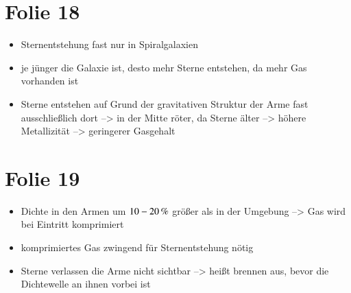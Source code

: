 \section{Folie 18}

\begin{itemize}
\item Sternentstehung fast nur in Spiralgalaxien
\item je jünger die Galaxie ist, desto mehr Sterne entstehen, da mehr Gas vorhanden ist
\item Sterne entstehen auf Grund der gravitativen Struktur der Arme fast ausschließlich dort --> in der Mitte röter, da Sterne älter --> höhere Metallizität --> geringerer Gasgehalt
\end{itemize}


\section{Folie 19}

\begin{itemize}
\item Dichte in den Armen um $\unit[10-20]{\%}$ größer als in der Umgebung --> Gas wird bei Eintritt komprimiert
\item komprimiertes Gas zwingend für Sternentstehung nötig
\item Sterne verlassen die Arme nicht sichtbar --> heißt brennen aus, bevor die Dichtewelle an ihnen vorbei ist
\end{itemize}



